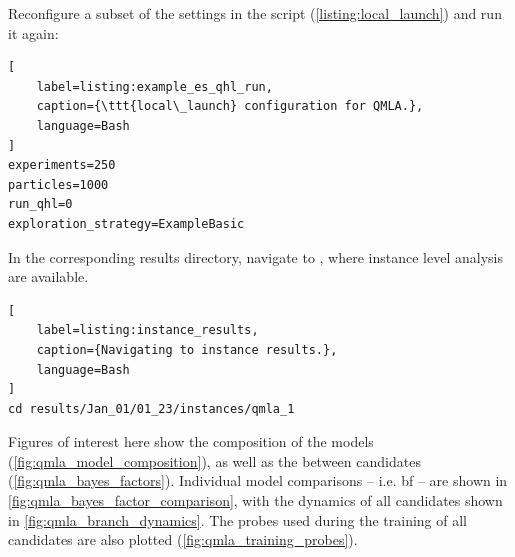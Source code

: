 Reconfigure a subset of the settings in the  script (\cref{listing:local_launch}) and run it again:
\begin{lstlisting}[
    label=listing:example_es_qhl_run,
    caption={\ttt{local\_launch} configuration for QMLA.},
    language=Bash
]
experiments=250
particles=1000
run_qhl=0
exploration_strategy=ExampleBasic
\end{lstlisting}

\par 

In the corresponding \gls{results directory}, navigate to , where instance level analysis are available. 

\begin{lstlisting}[
    label=listing:instance_results,
    caption={Navigating to instance results.},
    language=Bash
]
cd results/Jan_01/01_23/instances/qmla_1
\end{lstlisting}

Figures of interest here show the composition of the models (\cref{fig:qmla_model_composition}), 
    as well as the  between candidates (\cref{fig:qmla_bayes_factors}). 
Individual model comparisons -- i.e. \acrfull{bf} -- 
    are shown in \cref{fig:qmla_bayes_factor_comparison}, 
    with the dynamics of all candidates shown in \cref{fig:qmla_branch_dynamics}. 
The probes used during the training of all candidates are also plotted  (\cref{fig:qmla_training_probes}).

